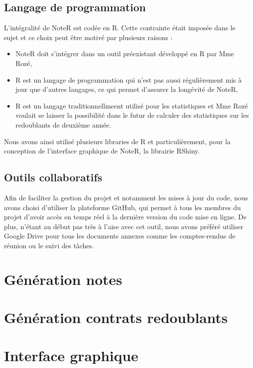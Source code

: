 \documentclass[a4paper,11pt]{article}
\begin{document}
\subsection{Langage de programmation }
    L'intégralité de NoteR est codée en R. Cette contrainte était imposée dans le sujet et ce choix peut être motivé par plusieurs raisons :
        \begin{itemize}
            \item NoteR doit s'intégrer dans un outil préexistant développé en R par Mme Rozé,
            \item R est un langage de programmation qui n'est pas aussi régulièrement mis à jour que d'autres langages, ce qui permet d'assurer la longévité de NoteR,
            \item  R est un langage traditionnellmeent utilisé pour les statistiques et Mme Rozé voulait se laisser la possibilité dans le futur de calculer des statistiques sur les redoublants de deuxième année.
        \end{itemize}
        Nous avons ainsi utilisé plusieurs libraries de R et particulièrement, pour la conception de l'interface graphique de NoteR, la librairie RShiny.
\subsection{Outils collaboratifs }
    Afin de faciliter la gestion du projet et notamment les mises à jour du code, nous avons choisi d'utiliser la plateforme GitHub, qui permet à tous les membres du projet d'avoir accès en temps réel à la dernière version du code mise en ligne. De plus, n'étant au début pas très à l'aise avec cet outil, nous avons préféré utiliser Google Drive pour tous les documents annexes comme les comptes-rendus de réunion ou le suivi des tâches.
  
\section{Génération notes }
  

\section{Génération contrats redoublants}
  

\section{Interface graphique }	
\end{document}
